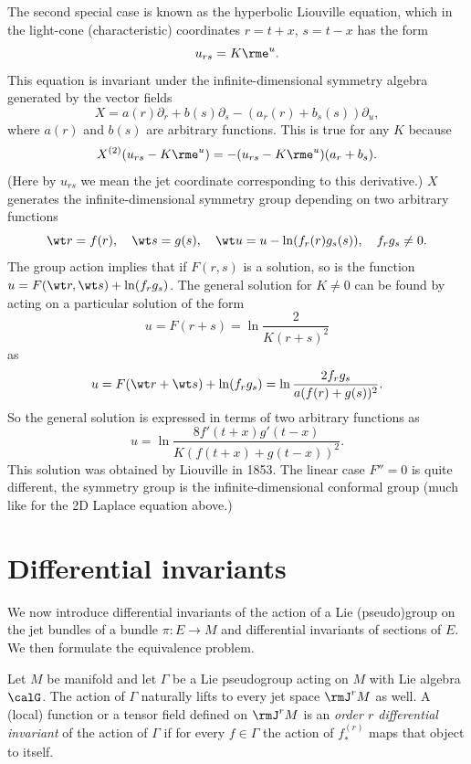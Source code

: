 \begin{example}
    The second special case is known as the hyperbolic Liouville equation, which in the light-cone (characteristic) coordinates $r=t+x$, $s=t-x$ has the form 
    \[u_{rs}=K\rme^u.\]
    This equation is invariant under the infinite-dimensional symmetry algebra generated by the vector fields 
    \[X=a(r)\partial_r+b(s)\partial_s-(a_r(r)+b_s(s))\partial_u,\]
    where $a(r)$ and $b(s)$ are arbitrary functions. This is true for any $K$ because 
    \[X^{(2)}(u_{rs}-K\rme^u)=-(u_{rs}-K\rme^u)(a_r+b_s).\]
    (Here by $u_{rs}$ we mean the jet coordinate corresponding to this derivative.) $X$ generates the infinite-dimensional symmetry group depending on two arbitrary functions 
    \[\wt r=f(r),\quad \wt s=g(s),\quad \wt u=u-\ln(f_r(r)g_s(s)),\quad f_rg_s\neq 0.\]
    The group action implies that if $F(r,s)$ is a solution, so is the function $u=F(\wt r,\wt s)+\ln(f_rg_s)$. The general solution for $K\neq 0$ can be found by acting on a particular solution of the form 
    \[u=F(r+s)=\ln\frac{2}{K(r+s)^2}\]
    as 
    \[u=F(\wt r+\wt s)+\ln (f_rg_s)=\ln\frac{2f_rg_s}{a(f(r)+g(s))^2}.\]
    So the general solution is expressed in terms of two arbitrary functions as
    \[u=\ln\frac{8 f'(t+x)g'(t-x)}{K(f(t+x)+g(t-x))^2}.\]
    This solution was obtained by Liouville in 1853. The linear case $F''=0$ is quite different, the symmetry group is the infinite-dimensional conformal group (much like for the 2D Laplace equation above.)
\end{example}






\section{Differential invariants}

We now introduce differential invariants of the action of a Lie (pseudo)group on the jet bundles of a bundle $\pi:E\to M$ and differential invariants of sections of $E$. We then formulate the equivalence problem. 


\begin{defn}
    Let $M$ be manifold and let $\Gamma$ be a Lie pseudogroup acting on $M$ with Lie algebra $\calG$. The action of $\Gamma$ naturally lifts to every jet space $\rmJ^r M$ as well. A (local) function or a tensor field defined on $\rmJ^r M$ is an \emph{order $r$ differential invariant} of the action of $\Gamma$ if for every $f\in\Gamma$ the action of $f^{(r)}_\ast$ maps that object to itself.
\end{defn}

